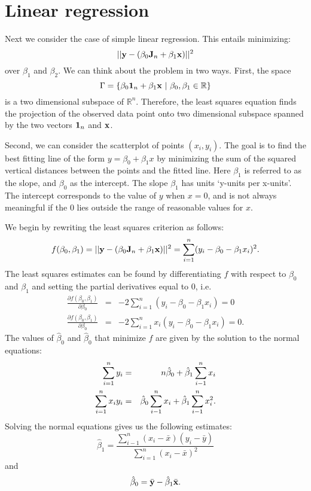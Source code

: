 \section{Linear regression}


Next we consider the case of simple linear regression. 
This entails minimizing:
\begin{equation}
\label{eq:line}
|| \mathbf{y} - (\beta_0 \mathbf{J}_n + \beta_1 \mathbf{x}) ||^2
\end{equation}
over $\beta_1$ and $\beta_2$. 
We can think about the problem in two ways.
First, the space $$\Gamma = \{\beta_0 \mathbf{1}_n + \beta_1 \mathbf{x} ~|~ \beta_0, \beta_1 \in \mathbb{R}\}$$
is a two dimensional subspace of $\mathbb{R}^n$. Therefore, the least squares
equation finds the projection of the observed data point 
onto two dimensional subspace spanned by the two vectors $\mathbf{1}_n$ and $\mathbf{x}$.

Second, we can consider the scatterplot
of points $(x_i, y_i)$. The goal is to find the best fitting line
of the form $y = \beta_0 + \beta_1 x$ by minimizing the sum of the
squared vertical distances between the points and the fitted line. 
Here $\beta_1$ is referred to as the slope, and $\beta_0$ as the intercept.
The slope $\beta_1$ has units `y-units per x-units'. 
The intercept corresponds to the value of $y$ when $x=0$, and is not always meaningful if the $0$ lies outside the range of reasonable values for $x$.

We begin by rewriting the least squares criterion as follows:
\begin{equation}
f(\beta_0, \beta_1) = || \mathbf{y} - (\beta_0 \mathbf{J}_n + \beta_1 \mathbf{x}) ||^2 = \sum_{i=1}^n (y_i - \beta_0 - \beta_1 x_i)^2.
\end{equation}
The least squares estimates can be found by differentiating $f$ with respect to $\beta_0$ and $\beta_1$ and setting the partial derivatives equal to $0$, i.e.
\begin{eqnarray}
\frac{\partial f(\beta_0, \beta_1)}{\partial \beta_0} &=& -2 \sum_{i=1}^n (y_i - \beta_0 - \beta_1 x_i) =0\\
\frac{\partial f(\beta_0, \beta_1)}{\partial \beta_0} &=& -2 \sum_{i=1}^n x_i(y_i - \beta_0 - \beta_1 x_i) =0.
\end{eqnarray}
The values of $\hat \beta_0$ and $\hat \beta_0$ that minimize $f$ are given by the solution to the normal equations:
\begin{eqnarray}
\sum_{i=1}^n y_i &=& n  \hat \beta_0 + \hat \beta_1 \sum_{i-1}^n x_i\\
\sum_{i=1}^n x_iy_i &=& \hat \beta_0 \sum_{i-1}^n x_i + \hat \beta_1 \sum_{i-1}^n x_i^2.
\end{eqnarray}
Solving the normal equations gives us the following estimates:
\begin{equation}
{\hat \beta_1} = \frac{ \sum_{i-1}^n (x_i- \bar x)(y_i - \bar y)}{\sum_{i=1}^n (x_i- \bar x)^2} 
\end{equation}
and
\begin{equation}
{\hat \beta_0} = \bar {\mathbf{y}} - \hat \beta_1 \bar {\mathbf{x}} .
\end{equation}

